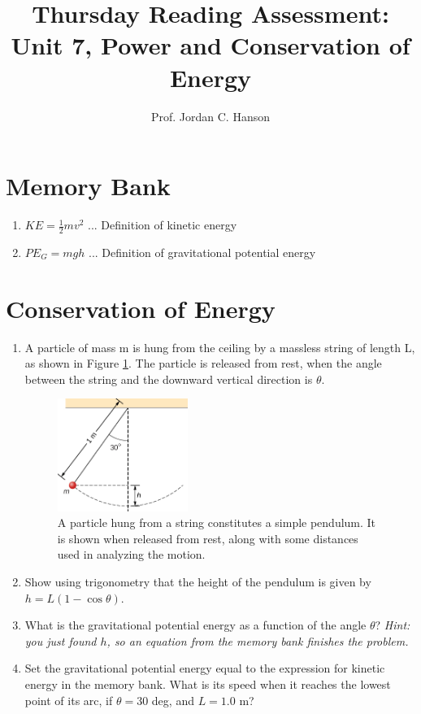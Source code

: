 \documentclass{article}
\begin{document}
\title{Thursday Reading Assessment: Unit 7, Power and Conservation of Energy}
\author{Prof. Jordan C. Hanson}

\maketitle

\section{Memory Bank}

\begin{enumerate}
\item $KE = \frac{1}{2}m v^2$ ... Definition of kinetic energy
\item $PE_G = mgh$ ... Definition of gravitational potential energy
\end{enumerate}

\section{Conservation of Energy}

\begin{enumerate}
\item A particle of mass m is hung from the ceiling by a massless string of length L, as shown in Figure \ref{fig:pend}. The particle is released from rest, when the angle between the string and the downward vertical direction is $\theta$.
\begin{figure}[ht]
\centering
\includegraphics[width=0.4\textwidth]{pend.png}
\caption{\label{fig:pend} A particle hung from a string constitutes a simple pendulum. It is shown when released from rest, along with some distances used in analyzing the motion.}
\end{figure}
\item Show using trigonometry that the height of the pendulum is given by $h = L(1-\cos\theta)$. \\ \vspace{1cm}
\item What is the gravitational potential energy as a function of the angle $\theta$? \textit{Hint: you just found $h$, so an equation from the memory bank finishes the problem.}\\ \vspace{1cm}
\item Set the gravitational potential energy equal to the expression for kinetic energy in the memory bank.  What is its speed when it reaches the lowest point of its arc, if $\theta = 30$ deg, and $L = 1.0$ m? 
\end{enumerate}
\end{document}
